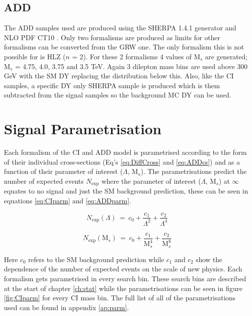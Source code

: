 	\subsection*{ADD}

	The ADD samples used are produced using the SHERPA 1.4.1 \cite{1126-6708-2009-02-007} generator and NLO PDF CT10 \cite{Lai:2010vv}. Only two formalisms are produced as limits for other formalisms can be converted from the GRW one. The only formalism this is not possible for is HLZ ($n$ = 2). For these 2 formalisms 4 values of M$_{s}$ are generated; M$_{s}$ = 4.75, 4.0, 3.75 and 3.5 TeV. Again 3 dilepton mass bins are used above 300 GeV with the SM DY replacing the distribution below this. Also, like the CI samples, a specific DY only SHERPA sample is produced which is them subtracted from the signal samples so the background MC DY can be used.



\section{Signal Parametrisation}
	\label{sec:parm}

	Each formalism of the CI and ADD model is parametrised according to the form of their individual cross-sections (Eq's \ref{eq:DiffCross} and \ref{eq:ADDcs}) and as a function of their parameter of interest ($\Lambda$, M$_{s}$). The parametrisations predict the number of expected events $N_{\text{exp}}$ where the parameter of interest ($\Lambda$, M$_{s}$) at $\infty$ equates to no signal and just the SM background prediction, these can be seen in equations \ref{eq:CIparm} and \ref{eq:ADDparm}. 

	\begin{equation}
        N_{\text{exp}}(\Lambda)~=~c_{0} + \frac{c_{1}}{\Lambda^{2}} + \frac{c_{2}}{\Lambda^{4}}
        \label{eq:CIparm}
    \end{equation}

    \begin{equation}
        N_{\text{exp}}(\text{M}_{s})~=~c_{0} + \frac{c_{1}}{\text{M}_{s}^{4}} + \frac{c_{2}}{\text{M}_{s}^{8}}
        \label{eq:ADDparm}
    \end{equation}

	Here $c_{0}$ refers to the SM background prediction while $c_{1}$ and $c_{2}$ show the dependence of the number of expected events on the scale of new physics. Each formalism gets parametrised in every search bin. These search bins are described at the start of chapter \ref{ch:stat} while the parametrisations can be seen in figure \ref{fig:CIparm} for every CI mass bin. The full list of all of the parametrisations used can be found in appendix \ref{ap:parm}.


